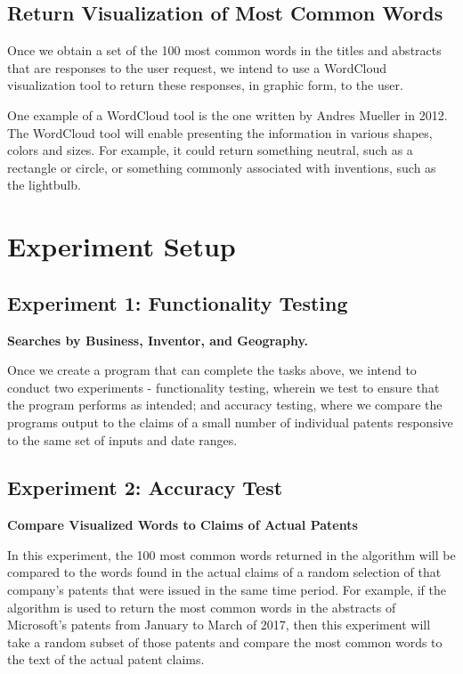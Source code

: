 \documentclass{article}
\begin{document}
\subsection{Return Visualization of Most Common Words}

Once we obtain a set of the 100 most common words in the titles and abstracts that are responses to the user request, we intend to use a WordCloud visualization tool to return these responses, in graphic form, to the user.  

One example of a WordCloud tool is the one written by Andres Mueller in 2012\cite{website:gh_tool}.  The WordCloud tool will enable presenting the information in various shapes, colors and sizes.  For example, it could return something neutral, such as a rectangle or circle, or something commonly associated with inventions, such as the lightbulb.  

\section{Experiment Setup}
\label{experiment_setup}

\subsection{Experiment 1: Functionality Testing}

\textbf{Searches by Business, Inventor, and Geography.}

Once we create a program that can complete the tasks above, we intend to conduct two experiments - functionality testing, wherein we test to ensure that the program performs as intended; and accuracy testing, where we compare the programs output to the claims of a small number of individual patents responsive to the same set of inputs and date ranges.

\subsection{Experiment 2: Accuracy Test}

\textbf{Compare Visualized Words to Claims of Actual Patents}

In this experiment, the 100 most common words returned in the algorithm will be compared to the words found in the actual claims of a random selection of that company’s patents that were issued in the same time period.  For example, if the algorithm is used to return the most common words in the abstracts of Microsoft’s patents from January to March of 2017, then this experiment will take a random subset of those patents and compare the most common words to the text of the actual patent claims. 
\end{document}
